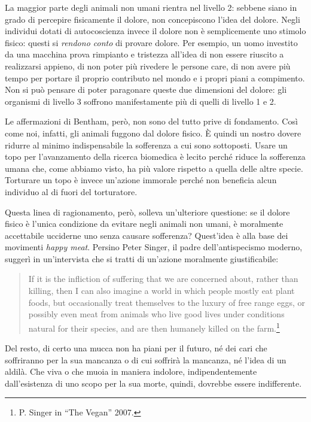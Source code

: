 \documentclass[a4paper,11pt,oneside,article]{memoir}
\begin{document}
La maggior parte degli animali non umani rientra nel livello 2: sebbene siano in
grado di percepire fisicamente il dolore, non concepiscono l'idea del dolore.
Negli individui dotati di autocoscienza invece il dolore non è semplicemente uno
stimolo fisico: questi si \emph{rendono conto} di provare dolore. Per esempio,
un uomo investito da una macchina prova rimpianto e tristezza all'idea di non
essere riuscito a realizzarsi appieno, di non poter più rivedere le persone
care, di non avere più tempo per portare il proprio contributo nel mondo e i
propri piani a compimento. Non si può pensare di poter paragonare queste due
dimensioni del dolore: gli organismi di livello 3 soffrono manifestamente più
di quelli di livello 1 e 2.

Le affermazioni di Bentham, però, non sono del tutto prive di fondamento. Così
come noi, infatti, gli animali fuggono dal dolore fisico. È quindi un nostro
dovere ridurre al minimo indispensabile la sofferenza a cui sono sottoposti.
Usare un topo per l'avanzamento della ricerca biomedica è lecito perché riduce
la sofferenza umana che, come abbiamo visto, ha più valore rispetto a quella
delle altre specie. Torturare un topo è invece un'azione immorale perché non
beneficia alcun individuo al di fuori del torturatore.

Questa linea di ragionamento, però, solleva un'ulteriore questione: se il dolore
fisico è l'unica condizione da evitare negli animali non umani, è moralmente
accettabile ucciderne uno senza causare sofferenza? Quest'idea è alla base dei
movimenti \emph{happy meat}. Persino Peter Singer, il padre dell'antispecismo
moderno, suggerì in un'intervista che si tratti di un'azione moralmente
giustificabile:

\begin{quote}

If it is the infliction of suffering that we are concerned about, rather than
killing, then I can also imagine a world in which people mostly eat plant foods,
but occasionally treat themselves to the luxury of free range eggs, or possibly
even meat from animals who live good lives under conditions natural for their
species, and are then humanely killed on the farm.\footnote{P. Singer in ``The
Vegan'' 2007.}

\end{quote}

Del resto, di certo una mucca non ha piani per il futuro, né dei cari che
soffriranno per la sua mancanza o di cui soffrirà la mancanza, né l'idea di un
aldilà. Che viva o che muoia in maniera indolore, indipendentemente
dall'esistenza di uno scopo per la sua morte, quindi, dovrebbe essere
indifferente.
\end{document}
